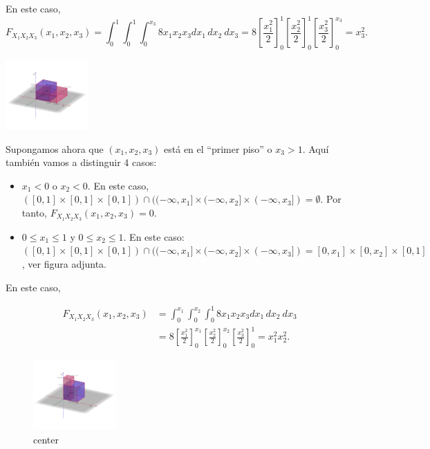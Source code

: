 \documentclass[
  letterpaper,
  DIV=11,
  numbers=noendperiod]{scrreprt}
\begin{document}
En este caso, \[
F_{X_1X_2X_3}(x_1,x_2,x_3)=\int_{0}^{1}\int_{0}^{1}\int_{0}^{x_3} 8 x_1 x_2 x_3 dx_1\, dx_2\ dx_3 = 
8\left[\frac{x_1^2}{2}\right]_0^{1}\left[\frac{x_2^2}{2}\right]_0^{1}\left[\frac{x_3^2}{2}\right]_0^{x_3} = x_3^2.
\]

\includegraphics[width=1.25in,height=\textheight]{Images/Fx1x2x3bajosx1x2.png}

Supongamos ahora que \((x_1,x_2,x_3)\) está en el ``primer piso'' o
\(x_3>1\). Aquí también vamos a distinguir 4 casos:

\begin{itemize}
\item
  \(x_1 <0\) o \(x_2 <0\). En este caso,
  \(([0,1]\times [0,1]\times [0,1])\cap ((-\infty,x_1]\times (-\infty,x_2]\times (-\infty,x_3])=\emptyset\).
  Por tanto, \(F_{X_1X_2X_3}(x_1,x_2,x_3)=0\).
\item
  \(0\leq x_1\leq 1\) y \(0\leq x_2\leq 1\). En este caso:
  \(([0,1]\times [0,1]\times [0,1])\cap ((-\infty,x_1]\times (-\infty,x_2]\times (-\infty,x_3])=[0,x_1]\times [0,x_2]\times [0,1]\),
  ver figura adjunta.
\end{itemize}

En este caso,

\[
\begin{array}{rl}
F_{X_1X_2X_3}(x_1,x_2,x_3) & =\int_{0}^{x_1}\int_{0}^{x_2}\int_{0}^{1} 8 x_1 x_2 x_3 dx_1\, dx_2\ dx_3\\
& = 8\left[\frac{x_1^2}{2}\right]_0^{x_1}\left[\frac{x_2^2}{2}\right]_0^{x_2}\left[\frac{x_3^2}{2}\right]_0^{1} = x_1^2 x_2^2.
\end{array}
\]

\begin{figure}

{\centering \includegraphics[width=1.25in,height=\textheight]{Images/Fx1x2x3piso.png}

}

\caption{center}

\end{figure}
\end{document}
